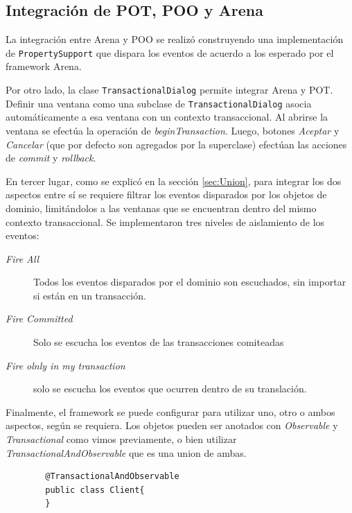 \subsection{Integración de POT, POO y Arena}
La integración entre Arena y POO se realizó construyendo una implementación de
\lstinline|PropertySupport| que dispara los eventos de acuerdo a los esperado
por el framework Arena.

\medskip
Por otro lado, la clase \lstinline|TransactionalDialog| permite integrar Arena y
POT.
Definir una ventana como una subclase de
\lstinline|TransactionalDialog| asocia automáticamente a esa ventana con un
contexto transaccional.
Al abrirse la ventana se efectúa la operación de \emph{beginTransaction}.
Luego, botones \emph{Aceptar} y \emph{Cancelar} (que por defecto son agregados
por la superclase) efectúan las acciones de \emph{commit} y
\emph{rollback}.

\medskip
En tercer lugar, como se explicó en la sección \ref{sec:Union}, para integrar
los dos aspectos entre sí se requiere filtrar los eventos disparados por los objetos de dominio, 
limitándolos a las ventanas que se encuentran dentro del mismo contexto
transaccional. 
Se implementaron tres niveles de aislamiento de los eventos:
\begin{description}
	\item[\emph{Fire All}] Todos los eventos disparados por el dominio son
	escuchados, sin importar si están en un transacción.

	\item[\emph{Fire Committed}] Solo se escucha los eventos de las transacciones
		comiteadas
	
	\item[\emph{Fire olnly in my transaction}] solo se escucha los eventos que
		ocurren dentro de su translación.
 \end{description}
 
\medskip
Finalmente, el framework se puede configurar para utilizar uno, otro o ambos
aspectos, según se requiera.
Los objetos pueden ser anotados con \emph{Observable} y
\emph{Transactional} como vimos previamente, 
o bien utilizar \emph{TransactionalAndObservable} que es una union de ambas.

	\begin{lstlisting} 
		@TransactionalAndObservable
		public class Client{
		}
	\end{lstlisting}

